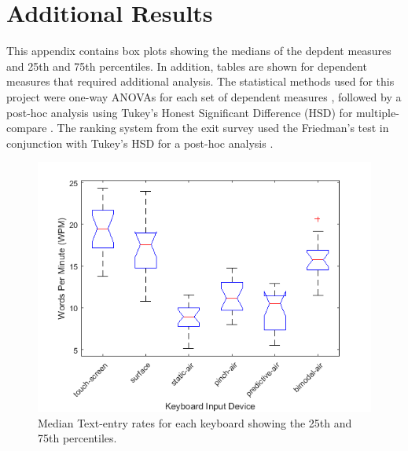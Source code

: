 \chapter{Additional Results} \label{additional_results}
\hspace{\parindent} This appendix contains box plots showing the medians of the depdent measures and 25th and 75th percentiles. In addition, tables are shown for dependent measures that required additional analysis. The statistical methods used for this project were one-way ANOVAs for each set of dependent measures \cite{ref_anova_1,ref_anova_2}, followed by a post-hoc analysis using Tukey's Honest Significant Difference (HSD) for multiple-compare \cite{ref_mult_compare}. The ranking system from the exit survey used the Friedman's test in conjunction with Tukey's HSD for a post-hoc analysis \cite{ref_friedmans}.

\clearpage

\begin{figure}[t]
	\centering
	\includegraphics{Figures/fig_textentry_boxplot}
	\caption[Text-entry Rate Boxplot]{Median Text-entry rates for each keyboard showing the 25th and 75th percentiles.}
	\label{fig_textentry_boxplot}
\end{figure}

